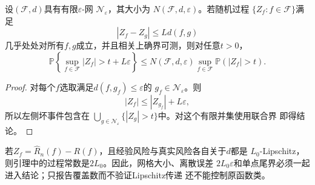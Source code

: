 \begin{lemma}[覆盖数的有限网控制]
  \label{lem:probability-covering-finite-net}
  设\((\mathcal{F},d)\)具有有限\(\varepsilon\)-网
  \(\mathcal{N}_\varepsilon\)，其大小为
  \(N(\mathcal{F},d,\varepsilon)\)。若随机过程
  \(\{Z_f:f\in\mathcal{F}\}\)满足
  \[
    |Z_f-Z_g|\leq Ld(f,g)
  \]
  几乎处处对所有\(f,g\)成立，并且相关上确界可测，则对任意\(t>0\)，
  \begin{equation}
    \mathbb{P}\left\{
      \sup_{f\in\mathcal{F}}|Z_f|>t+L\varepsilon
    \right\}
    \leq
    N(\mathcal{F},d,\varepsilon)
    \sup_{f\in\mathcal{F}}\mathbb{P}(|Z_f|>t).
    \label{eq:probability-covering-finite-net}
  \end{equation}
\end{lemma}

\begin{proof}
对每个\(f\)选取满足\(d(f,g_f)\leq\varepsilon\)的
\(g_f\in\mathcal{N}_\varepsilon\)。则
\[
  |Z_f|\leq |Z_{g_f}|+L\varepsilon,
\]
所以左侧坏事件包含在
\(\bigcup_{g\in\mathcal{N}_\varepsilon}\{|Z_g|>t\}\)中。对这个有限并集使用联合界
即得结论。
\end{proof}

若\(Z_f=\widehat R_n(f)-R(f)\)，且经验风险与真实风险各自关于\(d\)都是
\(L_0\)-Lipschitz，则引理中的过程常数是\(2L_0\)。因此，网格大小、离散误差
\(2L_0\varepsilon\)和单点尾界必须一起进入结论；只报告覆盖数而不验证Lipschitz传递
还不能控制原函数类。

